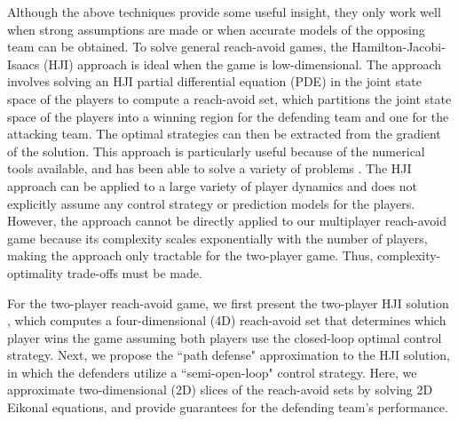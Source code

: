 Although the above techniques provide some useful insight, they only work well when strong assumptions are made or when accurate models of the opposing team can be obtained. To solve general reach-avoid games, the Hamilton-Jacobi-Isaacs (HJI) approach \cite{b:isaacs-1967} is ideal when the game is low-dimensional. The approach involves solving an HJI partial differential equation (PDE) in the joint state space of the players to compute a reach-avoid set, which partitions the joint state space of the players into a winning region for the defending team and one for the attacking team. The optimal strategies can then be extracted from the gradient of the solution. This approach is particularly useful because of the numerical tools \cite{j:mitchell-TAC-2005, Sethian1996, b:osher-fedkiw-2002} available, and has been able to solve a variety of problems \cite{Huang2011, j:mitchell-TAC-2005, DSST08}. The HJI approach can be applied to a large variety of player dynamics and does not explicitly assume any control strategy or prediction models for the players. However, the approach cannot be directly applied to our multiplayer reach-avoid game because its complexity scales exponentially with the number of players, making the approach only tractable for the two-player game. Thus, complexity-optimality trade-offs must be made.


For the two-player reach-avoid game, we first present the two-player HJI solution \cite{Huang2011}, which computes a four-dimensional (4D) reach-avoid set that determines which player wins the game assuming both players use the closed-loop optimal control strategy. Next, we propose the ``path defense" approximation to the HJI solution, in which the defenders utilize a ``semi-open-loop" control strategy. Here, we approximate two-dimensional (2D) slices of the reach-avoid sets by solving 2D Eikonal equations, and provide guarantees for the defending team's performance.

